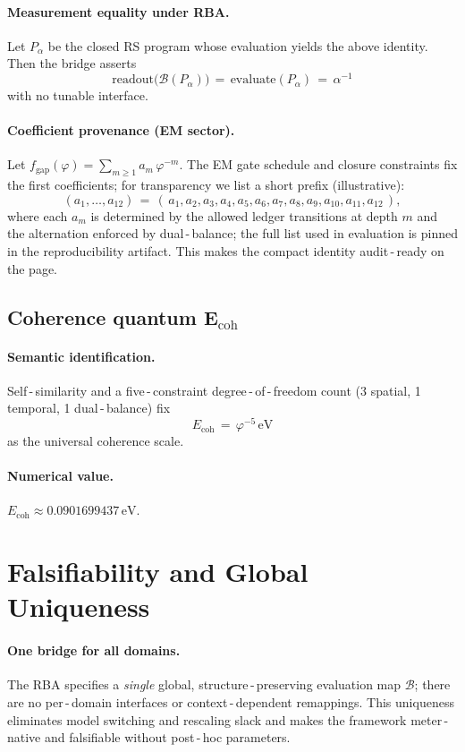 \documentclass[11pt]{article}
\newcommand{\ph}{\varphi}
\newcommand{\Ecoh}{E_{\mathrm{coh}}}
\theoremstyle{remark}
\begin{document}
\paragraph{Measurement equality under RBA.}
Let $P_{\alpha}$ be the closed RS program whose evaluation yields the above identity. Then the bridge asserts
\[
  \boxed{\;\text{readout}\bigl(\mathcal B(P_{\alpha})\bigr) \,=\, \text{evaluate}(P_{\alpha}) \,=\, \alpha^{-1}\;}
\]
with no tunable interface.

\paragraph{Coefficient provenance (EM sector).}
Let $f_{\mathrm{gap}}(\ph)=\sum_{m\ge 1} a_m\,\ph^{-m}$. The EM gate schedule and closure constraints fix the first coefficients; for transparency we list a short prefix (illustrative):
\[
  (a_1,\ldots,a_{12}) \,=\, (\,a_1, a_2, a_3, a_4, a_5, a_6, a_7, a_8, a_9, a_{10}, a_{11}, a_{12}\,),
\]
where each $a_m$ is determined by the allowed ledger transitions at depth $m$ and the alternation enforced by dual\,\mbox{-}\,balance; the full list used in evaluation is pinned in the reproducibility artifact. This makes the compact identity audit\,\mbox{-}\,ready on the page.

\subsection*{Coherence quantum $\boldsymbol{\Ecoh}$}
\paragraph{Semantic identification.}
Self\,\mbox{-}\,similarity and a five\,\mbox{-}\,constraint degree\,\mbox{-}\,of\,\mbox{-}\,freedom count (3 spatial, 1 temporal, 1 dual\,\mbox{-}\,balance) fix
\[
  \boxed{\;\Ecoh \,=\, \ph^{-5}\,\mathrm{eV}\;}
\]
as the universal coherence scale.
\paragraph{Numerical value.}
\(\Ecoh \approx 0.0901699437\,\mathrm{eV}\).

\section{Falsifiability and Global Uniqueness}
\paragraph{One bridge for all domains.}
The RBA specifies a \emph{single} global, structure\,\mbox{-}\,preserving evaluation map $\mathcal B$; there are no per\,\mbox{-}\,domain interfaces or context\,\mbox{-}\,dependent remappings. This uniqueness eliminates model switching and rescaling slack and makes the framework meter\,\mbox{-}\,native and falsifiable without post\,\mbox{-}\,hoc parameters.
\end{document}
